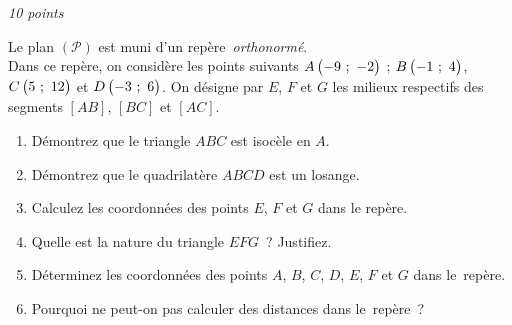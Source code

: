 \vspace*{1em}

\begin{minipage}{0.45\textwidth}
\thispagestyle{sujet2}

\vspace*{1em}

%


\exercice\hfill \emph{10 points}

Le plan $\left(\mathscr{P}\right)$ est muni d'un repère~\emph{orthonormé}.\\ Dans ce repère, on considère les points suivants $A\begin{pmatrix}-9~;~-2\end{pmatrix}$ ; $B\begin{pmatrix}-1~;~4\end{pmatrix}$, $C\begin{pmatrix}5~;~12\end{pmatrix}$ et $D\begin{pmatrix}-3~;~6\end{pmatrix}$.
On désigne par $E$, $F$ et $G$ les milieux respectifs des segments $\left[AB\right]$,  $\left[BC\right]$ et $\left[AC\right]$.

\begin{enumerate}
	\item Démontrez que le triangle $ABC$ est isocèle en $A$.
	\item Démontrez que le quadrilatère $ABCD$ est un losange.
	\item Calculez les coordonnées des points $E$, $F$ et $G$ dans le repère.
	\item Quelle est la nature du triangle $EFG$~? Justifiez.
	\item Déterminez les coordonnées des points $A$, $B$, $C$, $D$, $E$, $F$ et $G$ dans le~repère.
	\item Pourquoi ne peut-on pas calculer des distances dans le~repère~?
\end{enumerate}


\end{minipage}
